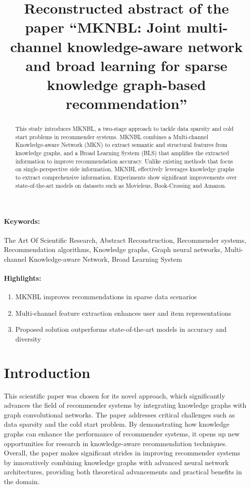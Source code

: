 \documentclass[12pt]{article}
\title{Reconstructed abstract of the paper ``MKNBL: Joint multi-channel knowledge-aware network and broad learning for sparse knowledge graph-based recommendation''}
\date{}
\begin{document}
\maketitle

\begin{abstract}
This study introduces MKNBL, a two-stage approach to tackle data sparsity and cold start problems in recommender systems. MKNBL combines a Multi-channel Knowledge-aware Network (MKN) to extract semantic and structural features from knowledge graphs, and a Broad Learning System (BLS) that amplifies the extracted information to improve recommendation accuracy. Unlike existing methods that focus on single-perspective side information, MKNBL effectively leverages knowledge graphs to extract comprehensive information. Experiments show significant improvements over state-of-the-art models on datasets such as Movielens, Book-Crossing and Amazon.
\end{abstract}
\paragraph{Keywords:} The Art Of Scientific Research, Abstract Reconstruction, Recommender systems, Recommendation algorithms, Knowledge graphs, Graph neural networks, Multi-channel Knowledge-aware Network, Broad Learning System  

\paragraph{Highlights:}
\begin{enumerate}
\item MKNBL improves recommendations in sparse data scenarios
\item Multi-channel feature extraction enhances user and item representations
\item Proposed solution outperforms state-of-the-art models in accuracy and diversity
\end{enumerate}

\section{Introduction}
This scientific paper was chosen for  its novel approach, which significantly advances the field of recommender systems by integrating knowledge graphs with graph convolutional networks. The paper addresses critical challenges such as data sparsity and the cold start problem. By demonstrating how knowledge graphs can enhance the performance of recommender systems, it opens up new opportunities for research in knowledge-aware recommendation techniques. Overall, the paper makes significant strides in improving recommender systems by innovatively combining knowledge graphs with advanced neural network architectures, providing both theoretical advancements and practical benefits in the domain.

%
%
\end{document}
